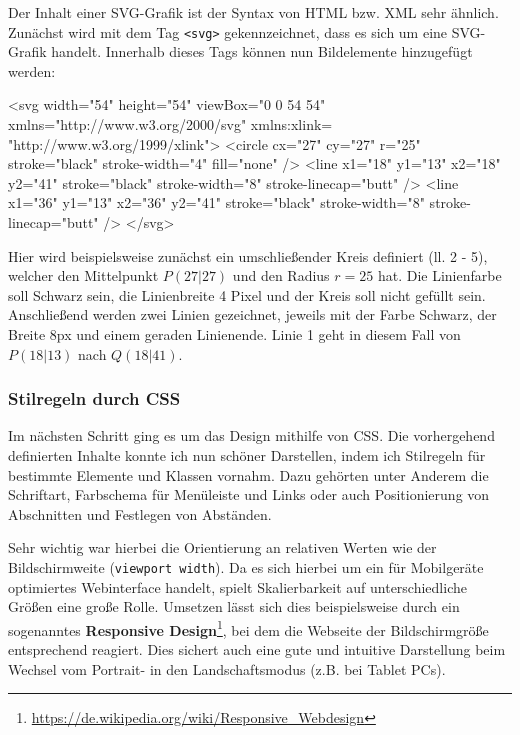 Der Inhalt einer SVG-Grafik ist der Syntax von HTML bzw. XML sehr ähnlich. Zunächst
wird mit dem Tag \texttt{<svg>} gekennzeichnet, dass es sich um eine SVG-Grafik
handelt. Innerhalb dieses Tags können nun Bildelemente hinzugefügt werden:

\begin{code}[language=svg, caption={Bildelemente in einer SVG-Grafik}]
<svg width="54" height="54" viewBox="0 0 54 54" xmlns="http://www.w3.org/2000/svg" xmlns:xlink= "http://www.w3.org/1999/xlink">
	<circle
		cx="27" cy="27" r="25"
		stroke="black" stroke-width="4" fill="none"
	/>
	<line
		x1="18" y1="13"
		x2="18" y2="41"
		stroke="black" stroke-width="8" stroke-linecap="butt"
	/>
	<line
		x1="36" y1="13"
		x2="36" y2="41"
		stroke="black" stroke-width="8" stroke-linecap="butt"
	/>
</svg>
\end{code}

Hier wird beispielsweise zunächst ein umschließender Kreis definiert (ll. 2 - 5),
welcher den Mittelpunkt $P(27|27)$ und den Radius $r = 25$ hat. Die Linienfarbe
soll Schwarz sein, die Linienbreite 4 Pixel und der Kreis soll nicht gefüllt sein.
Anschließend werden zwei Linien gezeichnet, jeweils mit der Farbe Schwarz, der Breite
8px und einem geraden Linienende. Linie 1 geht in diesem Fall von $P(18|13)$ nach
$Q(18|41)$.

\subsubsection{Stilregeln durch CSS}

Im nächsten Schritt ging es um das Design mithilfe von CSS. Die vorhergehend definierten
Inhalte konnte ich nun schöner Darstellen, indem ich Stilregeln für bestimmte Elemente
und Klassen vornahm. Dazu gehörten unter Anderem die Schriftart, Farbschema für
Menüleiste und Links oder auch Positionierung von Abschnitten und Festlegen von
Abständen.

Sehr wichtig war hierbei die Orientierung an relativen Werten wie der Bildschirmweite
(\texttt{viewport width}). Da es sich hierbei um ein für Mobilgeräte optimiertes
Webinterface handelt, spielt Skalierbarkeit auf unterschiedliche Größen eine große
Rolle. Umsetzen lässt sich dies beispielsweise durch ein sogenanntes \textbf{Responsive
Design}\footnote{\url{https://de.wikipedia.org/wiki/Responsive_Webdesign}}, bei dem
die Webseite der Bildschirmgröße entsprechend reagiert. Dies sichert auch eine gute
und intuitive Darstellung beim Wechsel vom Portrait- in den Landschaftsmodus (z.B.
bei Tablet PCs).

